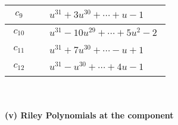 \documentclass[1p]{elsarticle_modified}
\theoremstyle{definition}
\begin{document}
\begin{tabular}{m{50pt}|m{274pt}}
\hline $$\begin{aligned}c_{9}\end{aligned}$$&$\begin{aligned}
&u^{31}+3 u^{30}+\cdots+u-1
\end{aligned}$\\
\hline $$\begin{aligned}c_{10}\end{aligned}$$&$\begin{aligned}
&u^{31}-10 u^{29}+\cdots+5 u^2-2
\end{aligned}$\\
\hline $$\begin{aligned}c_{11}\end{aligned}$$&$\begin{aligned}
&u^{31}+7 u^{30}+\cdots- u+1
\end{aligned}$\\
\hline $$\begin{aligned}c_{12}\end{aligned}$$&$\begin{aligned}
&u^{31}- u^{30}+\cdots+4 u-1
\end{aligned}$\\
\hline
\end{tabular}\\~\\
\newpage\renewcommand{\arraystretch}{1}
\flushleft \textbf{(v) Riley Polynomials at the component}\newline \\
\end{document}
